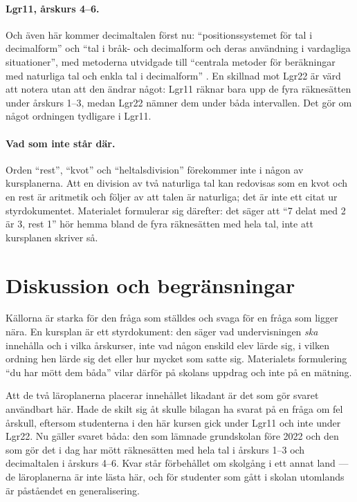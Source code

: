 \paragraph{Lgr11, årskurs 4--6.}
Och även här kommer decimaltalen först nu:
\enquote{positionssystemet för tal i decimalform} och \enquote{tal i
bråk- och decimalform och deras användning i vardagliga situationer},
med metoderna utvidgade till \enquote{centrala metoder för beräkningar
med naturliga tal och enkla tal i decimalform}%
\autocite[56]{Skolverket2019Lgr11}.  En skillnad mot Lgr22 är värd att
notera utan att den ändrar något: Lgr11 räknar bara upp de fyra
räknesätten under årskurs 1--3, medan Lgr22 nämner dem under båda
intervallen.  Det gör om något ordningen tydligare i Lgr11.

\paragraph{Vad som inte står där.}
Orden \enquote{rest}, \enquote{kvot} och \enquote{heltalsdivision}
förekommer inte i någon av kursplanerna.  Att en division av två
naturliga tal kan redovisas som en kvot och en rest är aritmetik och
följer av att talen är naturliga; det är inte ett citat ur
styrdokumentet.  Materialet formulerar sig därefter: det säger att
\enquote{7 delat med 2 är 3, rest 1} hör hemma bland de fyra
räknesätten med hela tal, inte att kursplanen skriver så.

\section{Diskussion och begränsningar}
\label{sec:lgr22-diskussion}

Källorna är starka för den fråga som ställdes och svaga för en fråga som
ligger nära.  En kursplan är ett styrdokument: den säger vad
undervisningen \emph{ska} innehålla och i vilka årskurser, inte vad
någon enskild elev lärde sig, i vilken ordning hen lärde sig det eller
hur mycket som satte sig.  Materialets formulering \enquote{du har mött
dem båda} vilar därför på skolans uppdrag och inte på en mätning.

Att de två läroplanerna placerar innehållet likadant är det som gör
svaret användbart här.  Hade de skilt sig åt skulle bilagan ha svarat
på en fråga om fel årskull, eftersom studenterna i den här kursen gick
under Lgr11 och inte under Lgr22.  Nu gäller svaret båda: den som
lämnade grundskolan före 2022 och den som gör det i dag har mött
räknesätten med hela tal i årskurs 1--3 och decimaltalen i årskurs
4--6.  Kvar står förbehållet om skolgång i ett annat land --- de
läroplanerna är inte lästa här, och för studenter som gått i skolan
utomlands är påståendet en generalisering.

